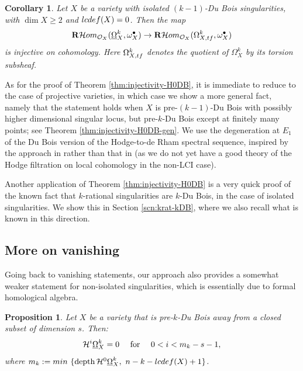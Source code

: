 \documentclass[11pt]{amsart}
\theoremstyle{definition}
\theoremstyle{plain}
\renewcommand{\H}{\mathcal H}
\renewcommand{\O}{\mathcal O}
\newcommand{\RHom}{{\bf R} \H om}
\newcommand{\DB}{\underline{\Omega}} %
\DeclareMathOperator{\depth}{depth}
\newcounter{intro}
\newtheorem{intro-corollary}[intro]{Corollary}
\newtheorem{intro-proposition}[intro]{Proposition}
\begin{document}
\begin{intro-corollary}
 Let $X$ be a variety with isolated $(k-1)$-Du Bois singularities, with $\dim X \ge 2$ and ${\rm lcdef} (X) = 0$.  Then the map
        \[\RHom_{\O_X}(\DB_X^k,\omega_X^{\bullet})\to \RHom_{\O_X}(\Omega_{X, {\rm tf}}^k,\omega_X^{\bullet})\]
 is injective on cohomology. Here $\Omega_{X, {\rm tf}}^k$ denotes the quotient of $\Omega_X^k$ by its torsion subsheaf.
 \end{intro-corollary}   

As for the proof of Theorem \ref{thm:injectivity-H0DB}, it is immediate to reduce to the case of projective varieties, in which case we show a more general fact, namely that the statement holds when $X$ is pre-$(k-1)$-Du Bois with possibly 
higher dimensional singular locus, but pre-$k$-Du Bois except at finitely many points; see Theorem \ref{thm:injectivity-H0DB-gen}. We use the degeneration at $E_1$ of the Du Bois version of the Hodge-to-de Rham spectral sequence, inspired by the approach in \cite{KS-injectivity} rather than that in \cite{MP-lci} (as we do not yet have a good theory of the Hodge filtration on local cohomology in the non-LCI case).

Another application of Theorem \ref{thm:injectivity-H0DB} is a very quick proof of the known fact that $k$-rational singularities are $k$-Du Bois, in the case of isolated singularities. We show this in Section \ref{scn:krat-kDB}, where we also recall what is known in this direction.




\subsection*{More on vanishing}
Going back to vanishing statements, our approach also provides a somewhat weaker statement for non-isolated singularities, which is essentially due to formal homological algebra. 

\begin{intro-proposition}\label{prop:vanishing-general}
 Let $X$ be a variety that is pre-$k$-Du Bois away from a closed subset of dimension $s$. Then:
 \[\H^i\DB^k_X = 0 \quad \text{ {\rm for} } \quad 0<i< m_k - s -1,\]
 where $m_k := {\rm min}~ \{\depth\H^0\DB^k_X, ~n - k - {\rm lcdef}(X)+ 1\}$.
\end{intro-proposition}
\end{document}

